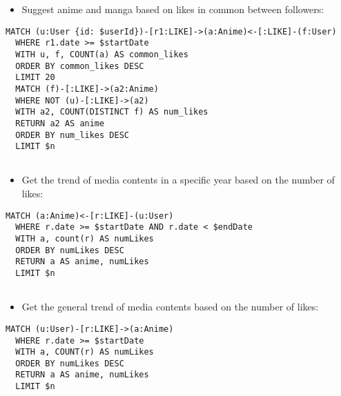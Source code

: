 \begin{itemize}
  \item Suggest anime and manga based on likes in common between followers:
\end{itemize}
\begin{lstlisting}[language=Cypher, caption=GetSuggestedByLikes]
  MATCH (u:User {id: $userId})-[r1:LIKE]->(a:Anime)<-[:LIKE]-(f:User)
  WHERE r1.date >= $startDate
  WITH u, f, COUNT(a) AS common_likes
  ORDER BY common_likes DESC
  LIMIT 20
  MATCH (f)-[:LIKE]->(a2:Anime)
  WHERE NOT (u)-[:LIKE]->(a2)
  WITH a2, COUNT(DISTINCT f) AS num_likes
  RETURN a2 AS anime
  ORDER BY num_likes DESC
  LIMIT $n
  
\end{lstlisting}


\begin{itemize}
  \item Get the trend of media contents in a specific year based on the number of likes:
\end{itemize}
\begin{lstlisting}[language=Cypher, caption=GetTrendMediaContentByYear]
  MATCH (a:Anime)<-[r:LIKE]-(u:User)
  WHERE r.date >= $startDate AND r.date < $endDate
  WITH a, count(r) AS numLikes
  ORDER BY numLikes DESC
  RETURN a AS anime, numLikes
  LIMIT $n
  
\end{lstlisting}

\begin{itemize}
  \item Get the general trend of media contents based on the number of likes:
\end{itemize}
\begin{lstlisting}[language=Cypher, caption=GetMediaContentTrendByLikes]
  MATCH (u:User)-[r:LIKE]->(a:Anime)
  WHERE r.date >= $startDate
  WITH a, COUNT(r) AS numLikes
  ORDER BY numLikes DESC
  RETURN a AS anime, numLikes
  LIMIT $n
  
\end{lstlisting}
